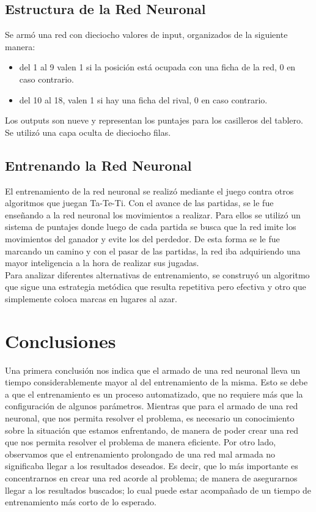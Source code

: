 \documentclass[12pt,titlepage]{article}
\begin{document}
\subsection{Estructura de la Red Neuronal}
Se arm\'o una red con dieciocho valores de input, organizados de la siguiente manera:
\begin{itemize}
 \item del 1 al 9 valen 1 si la posición está ocupada con una ficha de la red, 0 en caso contrario.
 \item del 10 al 18, valen 1 si hay una ficha del rival, 0 en caso contrario.
\end{itemize}
Los outputs son nueve y representan los puntajes para los casilleros del tablero. Se utiliz\'o una capa oculta de dieciocho filas. 

\subsection{Entrenando la Red Neuronal}
El entrenamiento de la red neuronal se realiz\'o mediante el juego contra otros algoritmos que juegan Ta-Te-Ti. Con el avance de las partidas, se le fue ense\~nando a la red neuronal los movimientos a realizar. Para ellos se utiliz\'o un sistema de puntajes donde luego de cada partida se busca que la red imite los movimientos del ganador y evite los del perdedor. De esta forma se le fue marcando un camino y con el pasar de las partidas, la red iba adquiriendo una mayor inteligencia a la hora de realizar sus jugadas. \\ 

Para analizar diferentes alternativas de entrenamiento, se construy\'o un algoritmo que sigue una estrategia met\'odica que resulta repetitiva pero efectiva y otro que simplemente coloca marcas en lugares al azar.

\pagebreak
\section{Conclusiones}
Una primera conclusi\'on nos indica que el armado de una red neuronal lleva un tiempo considerablemente mayor al del entrenamiento de la misma. Esto se debe a que el entrenamiento es un proceso automatizado, que no requiere m\'as que la conﬁguraci\'on de algunos par\'ametros. Mientras que para el armado de una red neuronal, que nos permita resolver el problema, es necesario un conocimiento sobre la situaci\'on que
estamos enfrentando, de manera de poder crear una red que nos permita resolver el problema de manera eﬁciente. Por otro lado, observamos que el entrenamiento prolongado de una red mal armada no signiﬁcaba llegar a los resultados deseados. Es decir, que lo m\'as importante es concentrarnos en crear una red acorde al problema; de manera de asegurarnos llegar a los resultados buscados; lo cual puede estar acompa\~nado de un tiempo de entrenamiento m\'as corto de lo esperado. \\
\end{document}
